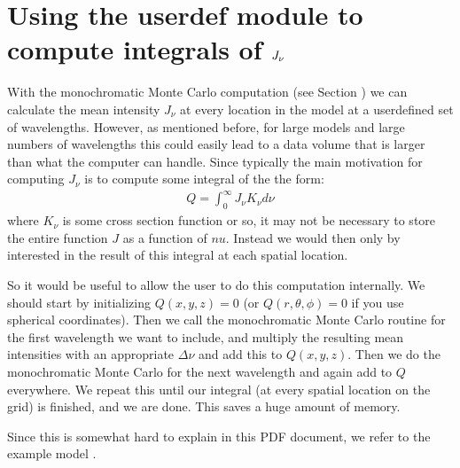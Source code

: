 \documentclass[letterpaper,10pt,english]{sphinxmanual}
\begin{document}
\section{Using the userdef module to compute integrals of \protect\(J_\nu\protect\)}
\label{\detokenize{internalsetup:using-the-userdef-module-to-compute-integrals-of-j-nu}}\label{\detokenize{internalsetup:sec-compute-radiation-integrals}}
With the monochromatic Monte Carlo computation (see Section
{\hyperref[\detokenize{dustradtrans:sec-dust-monochromatic-monte-carlo}]{}}) we can calculate the mean intensity
\(J_\nu\) at every location in the model at a user\sphinxhyphen{}defined set of
wavelengths. However, as mentioned before, for large models and large numbers of
wavelengths this could easily lead to a data volume that is larger than what the
computer can handle. Since typically the main motivation for computing
\(J_\nu\) is to compute some integral of the the form:
\begin{equation*}
\begin{split}Q = \int_0^{\infty} J_\nu K_\nu d\nu\end{split}
\end{equation*}
where \(K_\nu\) is some cross section function or so, it may not be
necessary to store the entire function \(J\) as a function of \(nu\).
Instead we would then only by interested in the result of this integral
at each spatial location.

So it would be useful to allow the user to do this computation internally.  We
should start by initializing \(Q(x,y,z)=0\) (or \(Q(r,\theta,\phi)=0\)
if you use spherical coordinates). Then we call the monochromatic Monte Carlo
routine for the first wavelength we want to include, and multiply the resulting
mean intensities with an appropriate \(\Delta\nu\) and add this to
\(Q(x,y,z)\). Then we do the monochromatic Monte Carlo for the next
wavelength and again add to \(Q\) everywhere. We repeat this until our
integral (at every spatial location on the grid) is finished, and we are
done. This saves a huge amount of memory.

Since this is somewhat hard to explain in this PDF document, we refer to
the example model .

\end{document}
